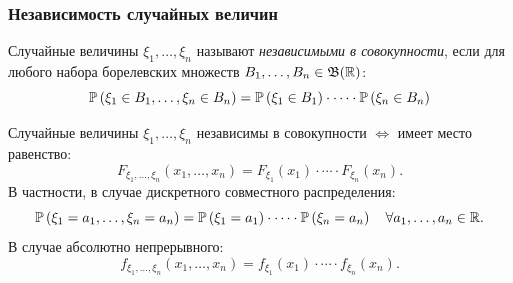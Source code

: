 \subsubsection{Независимость случайных величин}
\begin{defn}
    Случайные величины $\xi_1, \ldots, \xi_n$ называют \textit{независимыми в совокупности}, если для любого набора борелевских множеств $B_{1}, \ldots, B_{n} \in \mathfrak{B}(\mathbb{R})$:
    \begin{equation*}
        \operatorname{\mathbb{P}}\left(\xi_{1} \in B_{1}, \ldots, \xi_{n} \in B_{n}\right)=\operatorname{\mathbb{P}}\left(\xi_{1} \in B_{1}\right) \cdot \cdots \cdot \operatorname{\mathbb{P}}\left(\xi_{n} \in B_{n}\right)
    \end{equation*}
\end{defn}
\begin{namedthm}
    Случайные величины $\xi_1, \ldots, \xi_n$ независимы в совокупности $\iff$ имеет место равенство:
    \begin{equation*}
        F_{\xi_{1}, \ldots, \xi_{n}}\left(x_{1}, \ldots, x_{n}\right)=F_{\xi_{1}}\left(x_{1}\right) \cdot \cdots \cdot F_{\xi_{n}}\left(x_{n}\right).
    \end{equation*}
    В частности, в случае дискретного совместного распределения:
    \begin{equation*}
        \operatorname{\mathbb{P}}\left(\xi_{1}=a_{1}, \ldots, \xi_{n}=a_{n}\right)=\operatorname{\mathbb{P}}\left(\xi_{1}=a_{1}\right) \cdot \cdots \cdot \operatorname{\mathbb{P}}\left(\xi_{n}=a_{n}\right) \quad \forall a_1, \ldots, a_n \in \mathbb{R}.
    \end{equation*}
    В случае абсолютно непрерывного:
    \begin{equation*}
        f_{\xi_{1}, \ldots, \xi_{n}}\left(x_{1}, \ldots, x_{n}\right)=f_{\xi_{1}}\left(x_{1}\right) \cdot \cdots \cdot f_{\xi_{n}}\left(x_{n}\right).
    \end{equation*}
\end{namedthm}

